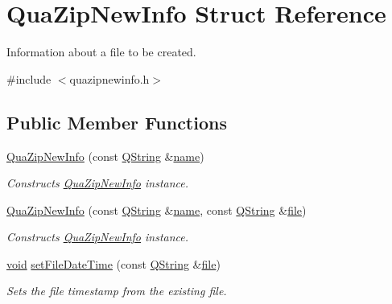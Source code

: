 \hypertarget{struct_qua_zip_new_info}{\section{Qua\-Zip\-New\-Info Struct Reference}
\label{struct_qua_zip_new_info}
}


Information about a file to be created.  




{\ttfamily \#include $<$quazipnewinfo.\-h$>$}

\subsection*{Public Member Functions}
\begin{DoxyCompactItemize}
\item 
\hyperlink{struct_qua_zip_new_info_a46c0f551cf9e6b2131929beb39187aac}{Qua\-Zip\-New\-Info} (const \hyperlink{group___u_a_v_objects_plugin_gab9d252f49c333c94a72f97ce3105a32d}{Q\-String} \&\hyperlink{glext_8h_ad977737dfc9a274a62741b9500c49a32}{name})
\begin{DoxyCompactList}\small\item\em Constructs \hyperlink{struct_qua_zip_new_info}{Qua\-Zip\-New\-Info} instance. \end{DoxyCompactList}\item 
\hyperlink{struct_qua_zip_new_info_ad47cf11f4277edcb09a8ba2b2963f2a9}{Qua\-Zip\-New\-Info} (const \hyperlink{group___u_a_v_objects_plugin_gab9d252f49c333c94a72f97ce3105a32d}{Q\-String} \&\hyperlink{glext_8h_ad977737dfc9a274a62741b9500c49a32}{name}, const \hyperlink{group___u_a_v_objects_plugin_gab9d252f49c333c94a72f97ce3105a32d}{Q\-String} \&\hyperlink{uavobjecttemplate_8m_a97c04efa65bcf0928abf9260bc5cbf46}{file})
\begin{DoxyCompactList}\small\item\em Constructs \hyperlink{struct_qua_zip_new_info}{Qua\-Zip\-New\-Info} instance. \end{DoxyCompactList}\item 
\hyperlink{group___u_a_v_objects_plugin_ga444cf2ff3f0ecbe028adce838d373f5c}{void} \hyperlink{struct_qua_zip_new_info_a2b18b554d056877a2f33ffb9d241ed85}{set\-File\-Date\-Time} (const \hyperlink{group___u_a_v_objects_plugin_gab9d252f49c333c94a72f97ce3105a32d}{Q\-String} \&\hyperlink{uavobjecttemplate_8m_a97c04efa65bcf0928abf9260bc5cbf46}{file})
\begin{DoxyCompactList}\small\item\em Sets the file timestamp from the existing file. \end{DoxyCompactList}\end{DoxyCompactItemize}
